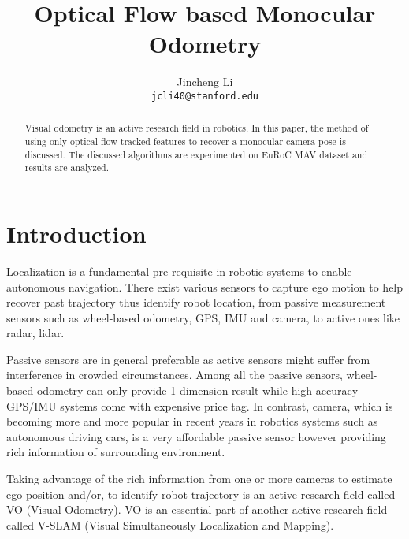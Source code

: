 \documentclass[10pt,twocolumn,letterpaper]{article}
\begin{document}
\title{Optical Flow based Monocular Odometry}

\author{Jincheng Li\\
{\tt\small jcli40@stanford.edu}
}

\maketitle

\begin{abstract}
   Visual odometry is an active research field in robotics. In this paper, 
   the method of using only optical flow tracked features to recover a 
   monocular camera pose is discussed. The discussed algorithms are 
   experimented on EuRoC MAV dataset and results are analyzed. 
\end{abstract}

\section{Introduction}

Localization is a fundamental pre-requisite in robotic systems to enable autonomous 
navigation. There exist various sensors to capture ego motion to help recover past trajectory thus identify robot location, from passive measurement sensors such as wheel-based odometry, GPS, IMU and camera, to active ones like radar, lidar. 

Passive sensors are in general preferable as active sensors might suffer from interference in crowded circumstances. Among all the passive sensors, wheel-based odometry can only provide 1-dimension result while high-accuracy GPS/IMU systems come with expensive price tag. In contrast, camera, which is becoming more and more popular in recent years in robotics systems such as autonomous driving cars, is a very affordable passive sensor however providing rich information of surrounding environment. 

Taking advantage of the rich information from one or more cameras to estimate ego position and/or, to identify robot trajectory is an active research field called VO (Visual Odometry). VO is an essential part of another active research field called V-SLAM (Visual Simultaneously Localization and Mapping).
\end{document}
